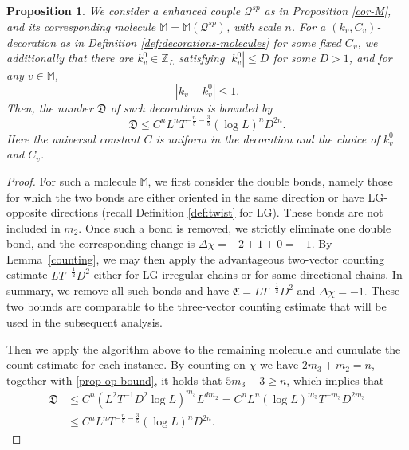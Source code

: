 \documentclass[UTF-8,reqno]{amsart}
\numberwithin{equation}{section}
\newtheorem{proposition}[theorem]{Proposition}
\theoremstyle{definition}
\def\geq{\geqslant}
\def\leq{\leqslant}
\def\geq{\geqslant}
\def\leq{\leqslant}
\begin{document}
\begin{proposition}\label{prop-rigidity:nodege}
 We consider a enhanced couple $\mathcal{Q}^{sp}$ as in Proposition \ref{cor-M}, and its corresponding molecule $\mathbb M = \mathbb M(\mathcal Q^{sp})$, with scale $n$. For a $(k_v,C_v)$-decoration as in Definition \ref{def:decorations-molecules} for some fixed $C_v$, we additionally that there are $k_v^0\in\mathbb{Z}_L$ satisfying $|k_v^0|\leq D$ for some $D>1$, and for any $v\in\mathbb{M}$, $$|k_v-k_v^0|\leq 1.$$
Then, the number $\mathfrak D$ of such  decorations is bounded by 
\begin{equation} 
\mathfrak D \leq C^n L^{n}T^{-\frac{n}{5} - \frac{3}{5}}(\log L)^nD^{2n}.
\end{equation}
Here the universal constant $C$ is uniform in the decoration and the choice of $k_v^0$ and $C_v$.
\end{proposition}
\begin{proof}
For such a molecule $\mathbb{M}$, we first consider the double bonds, 
namely those for which the two bonds are either oriented in the same direction 
or have LG-opposite directions (recall Definition \ref{def:twist} for LG). 
These bonds are not included in $m_2$. 
Once such a bond is removed, we strictly eliminate one double bond, 
and the corresponding change is
$\Delta \chi = -2 + 1 + 0 = -1.$
By Lemma~\ref{counting}, we may then apply the advantageous two-vector counting estimate
$L T^{-\frac{1}{2}} D^2$
either for LG-irregular chains or for same-directional chains. 
In summary, we remove all such bonds and have
$\mathfrak{C} = L T^{-\frac{1}{2}} D^2$ and $\Delta \chi = -1.$
These two bounds are comparable   to the three-vector counting estimate 
that will be used in the subsequent analysis.

 
 Then  we apply the algorithm above to the remaining molecule and cumulate the count estimate for each instance. By counting on $\chi$ we have $2m_3 + m_2 = n$, together with \eqref{prop-op-bound}, it holds that $5m_3 - 3 \geq n$, which implies that 
\begin{align*}
    \mathfrak D &\leq C^n (L^{2}T^{-1}D^2 \log L)^{m_3}L^{dm_2}= C^n L^{n}( \log L)^{m_3}  T^{-m_3}D^{2m_3} \\
    & \leq C^n L^{n}  T^{-\frac{n}{5} - \frac{3}{5}} (\log L)^nD^{2n}.
    \end{align*}
\end{proof} 


 
\end{document}
